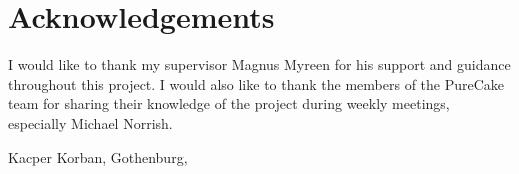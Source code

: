 \thispagestyle{plain}			%
\section*{Acknowledgements}
I would like to thank my supervisor Magnus Myreen for his support and guidance throughout this project. I would also like to thank the members of the PureCake team for sharing their knowledge of the project during weekly meetings, especially Michael Norrish.

\vspace{1.5cm}
\hfill
Kacper Korban, Gothenburg, \monthname \space \the\year

\newpage				%
\thispagestyle{empty}
\mbox{}